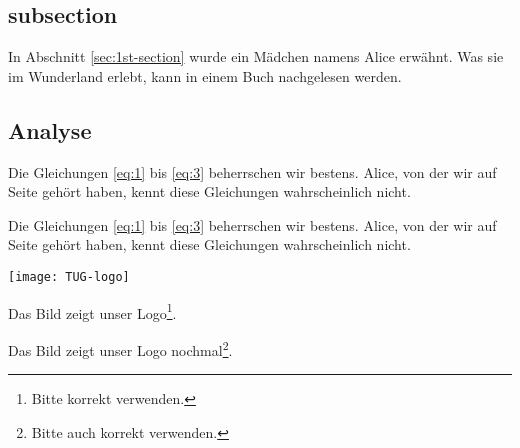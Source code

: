 \documentclass[12pt]{scrartcl}
\begin{document}
\subsection{subsection}
\label{sec:subsection}

In Abschnitt \ref{sec:1st-section} wurde ein Mädchen namens
Alice erwähnt. Was sie im Wunderland erlebt, kann in einem Buch
nachgelesen werden.

\subsection{Analyse}
\label{sec:analyse}

Die Gleichungen \eqref{eq:1} bis \eqref{eq:3} beherrschen wir bestens.
Alice, von der wir auf Seite \pageref{sec:einleitende-worte} gehört
haben, kennt diese Gleichungen wahrscheinlich nicht.

Die Gleichungen \eqref{eq:1} bis \eqref{eq:3} beherrschen wir bestens.
Alice, von der wir auf Seite \pageref{sec:einleitende-worte} gehört
haben, kennt diese Gleichungen wahrscheinlich nicht.

\begin{center}
\texttt{[image: TUG-logo]}
\end{center}

Das Bild zeigt unser Logo\footnote{Bitte korrekt verwenden.}.

Das Bild zeigt unser Logo nochmal\footnote{Bitte auch korrekt verwenden.}.
\end{document}
